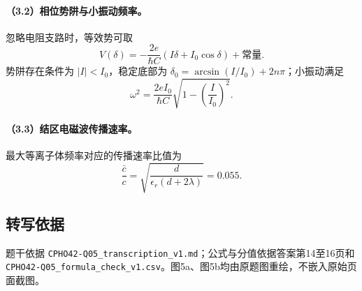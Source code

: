 \paragraph{（3.2）相位势阱与小振动频率。}
忽略电阻支路时，等效势可取
\[V(\delta)=-\frac{2e}{\hbar C}\left(I\delta+I_0\cos\delta\right)+\text{常量}.\]
势阱存在条件为 $|I|<I_0$，稳定底部为 $\delta_0=\arcsin(I/I_0)+2n\pi$；小振动满足
\[\omega^2=\frac{2eI_0}{\hbar C}\sqrt{1-\left(\frac{I}{I_0}\right)^2}.\]
\paragraph{（3.3）结区电磁波传播速率。}
最大等离子体频率对应的传播速率比值为
\[\frac{\bar c}{c}=\sqrt{\frac{d}{\epsilon_r(d+2\lambda)}}=0.055.\]
\subsection{转写依据}
题干依据 \texttt{CPHO42-Q05\_transcription\_v1.md}；公式与分值依据答案第14至16页和 \texttt{CPHO42-Q05\_formula\_check\_v1.csv}。图5a、图5b均由原题图重绘，不嵌入原始页面截图。
